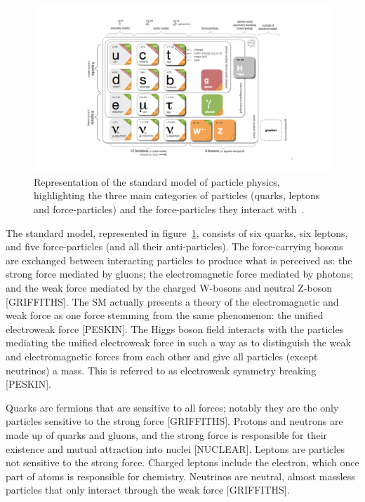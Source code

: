 \begin{figure}
    \centering
    \includegraphics[width = \textwidth]{figures/standardmodel_galbraith_carsten.png}
    \caption{Representation of the standard model of particle physics, highlighting the three main categories of particles (quarks, leptons and force-particles) and the force-particles they interact with~\cite{galbraith_ux_2013}.}
    \label{fig:standard_model}
\end{figure}

The standard model, represented in figure~\ref{fig:standard_model}, consists of six quarks, six leptons, and five force-particles (and all their anti-particles). The force-carrying bosons are exchanged between interacting particles to produce what is perceived as: the strong force mediated by gluons; the electromagnetic force mediated by photons; and the weak force mediated by the charged W-bosons and neutral Z-boson [GRIFFITHS]. The SM actually presents a theory of the electromagnetic and weak force as one force stemming from the same phenomenon: the unified electroweak force [PESKIN]. The Higgs boson field interacts with the particles mediating the unified electroweak force in such a way as to distinguish the weak and electromagnetic forces from each other and give all particles (except neutrinos) a mass. This is referred to as electroweak symmetry breaking [PESKIN]. 

Quarks are fermions that are sensitive to all forces; notably they are the only particles sensitive to the strong force [GRIFFITHS]. Protons and neutrons are made up of quarks and gluons, and the strong force is responsible for their existence and mutual attraction into nuclei [NUCLEAR]. Leptons are particles not sensitive to the strong force. Charged leptons include the electron, which once part of atoms is responsible for chemistry. Neutrinos are neutral, almost massless particles that only interact through the weak force [GRIFFITHS]. 

